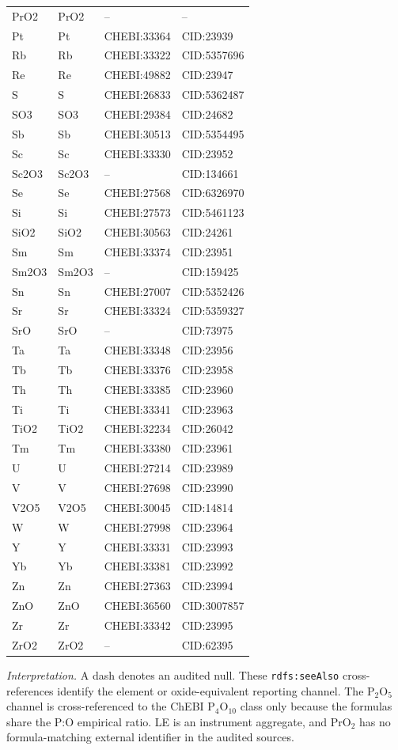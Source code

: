 \begin{longtable}{llll}
PrO2 & PrO2 & -- & -- \\
Pt & Pt & CHEBI:33364 & CID:23939 \\
Rb & Rb & CHEBI:33322 & CID:5357696 \\
Re & Re & CHEBI:49882 & CID:23947 \\
S & S & CHEBI:26833 & CID:5362487 \\
SO3 & SO3 & CHEBI:29384 & CID:24682 \\
Sb & Sb & CHEBI:30513 & CID:5354495 \\
Sc & Sc & CHEBI:33330 & CID:23952 \\
Sc2O3 & Sc2O3 & -- & CID:134661 \\
Se & Se & CHEBI:27568 & CID:6326970 \\
Si & Si & CHEBI:27573 & CID:5461123 \\
SiO2 & SiO2 & CHEBI:30563 & CID:24261 \\
Sm & Sm & CHEBI:33374 & CID:23951 \\
Sm2O3 & Sm2O3 & -- & CID:159425 \\
Sn & Sn & CHEBI:27007 & CID:5352426 \\
Sr & Sr & CHEBI:33324 & CID:5359327 \\
SrO & SrO & -- & CID:73975 \\
Ta & Ta & CHEBI:33348 & CID:23956 \\
Tb & Tb & CHEBI:33376 & CID:23958 \\
Th & Th & CHEBI:33385 & CID:23960 \\
Ti & Ti & CHEBI:33341 & CID:23963 \\
TiO2 & TiO2 & CHEBI:32234 & CID:26042 \\
Tm & Tm & CHEBI:33380 & CID:23961 \\
U & U & CHEBI:27214 & CID:23989 \\
V & V & CHEBI:27698 & CID:23990 \\
V2O5 & V2O5 & CHEBI:30045 & CID:14814 \\
W & W & CHEBI:27998 & CID:23964 \\
Y & Y & CHEBI:33331 & CID:23993 \\
Yb & Yb & CHEBI:33381 & CID:23992 \\
Zn & Zn & CHEBI:27363 & CID:23994 \\
ZnO & ZnO & CHEBI:36560 & CID:3007857 \\
Zr & Zr & CHEBI:33342 & CID:23995 \\
ZrO2 & ZrO2 & -- & CID:62395 \\
\end{longtable}
\noindent\textit{Interpretation.} A dash denotes an audited null. These \texttt{rdfs:seeAlso} cross-references identify the element or oxide-equivalent reporting channel. The P$_2$O$_5$ channel is cross-referenced to the ChEBI P$_4$O$_{10}$ class only because the formulas share the P:O empirical ratio. LE is an instrument aggregate, and PrO$_2$ has no formula-matching external identifier in the audited sources.
